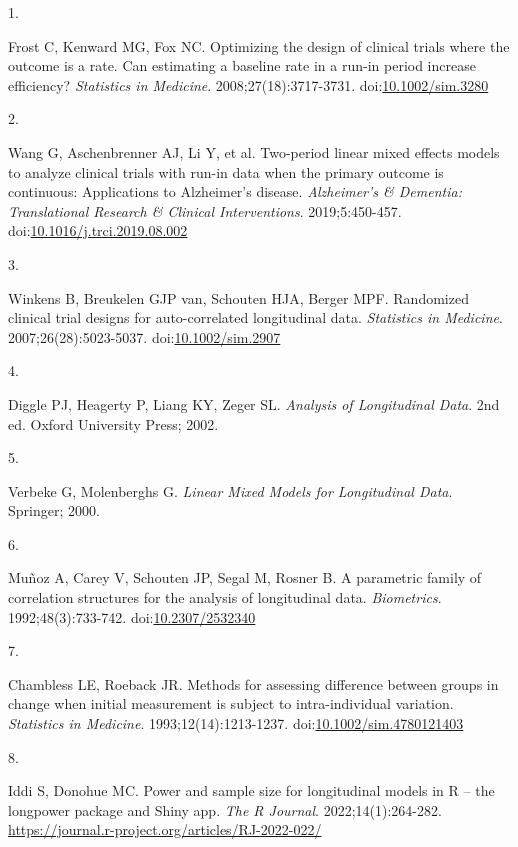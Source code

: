 \documentclass[
  11pt,
]{article}
\newlength{\cslhangindent}
\newlength{\csllabelwidth}
\newenvironment{CSLReferences}[2] %
 {\begin{list}{}{%
  \setlength{\itemindent}{0pt}
  \setlength{\leftmargin}{0pt}
  \setlength{\parsep}{0pt}
  \ifodd #1
   \setlength{\leftmargin}{\cslhangindent}
   \setlength{\itemindent}{-1\cslhangindent}
  \fi
  \setlength{\itemsep}{#2\baselineskip}}}
 {\end{list}}
\newcommand{\CSLLeftMargin}[1]{\parbox[t]{\csllabelwidth}{\strut#1\strut}}
\newcommand{\CSLRightInline}[1]{\parbox[t]{\linewidth - \csllabelwidth}{\strut#1\strut}}
\begin{document}
\protect{}\label{refs}
\begin{CSLReferences}{0}{1}
\CSLLeftMargin{1. }%
\CSLRightInline{Frost C, Kenward MG, Fox NC. Optimizing the design of clinical trials where the outcome is a rate. {Can} estimating a baseline rate in a run-in period increase efficiency? \emph{Statistics in Medicine}. 2008;27(18):3717-3731. doi:\href{https://doi.org/10.1002/sim.3280}{10.1002/sim.3280}}

\CSLLeftMargin{2. }%
\CSLRightInline{Wang G, Aschenbrenner AJ, Li Y, et al. Two-period linear mixed effects models to analyze clinical trials with run-in data when the primary outcome is continuous: {Applications} to {Alzheimer's} disease. \emph{Alzheimer's \& Dementia: Translational Research \& Clinical Interventions}. 2019;5:450-457. doi:\href{https://doi.org/10.1016/j.trci.2019.08.002}{10.1016/j.trci.2019.08.002}}

\CSLLeftMargin{3. }%
\CSLRightInline{Winkens B, Breukelen GJP van, Schouten HJA, Berger MPF. Randomized clinical trial designs for auto-correlated longitudinal data. \emph{Statistics in Medicine}. 2007;26(28):5023-5037. doi:\href{https://doi.org/10.1002/sim.2907}{10.1002/sim.2907}}

\CSLLeftMargin{4. }%
\CSLRightInline{Diggle PJ, Heagerty P, Liang KY, Zeger SL. \emph{Analysis of Longitudinal Data}. 2nd ed. Oxford University Press; 2002.}

\CSLLeftMargin{5. }%
\CSLRightInline{Verbeke G, Molenberghs G. \emph{Linear Mixed Models for Longitudinal Data}. Springer; 2000.}

\CSLLeftMargin{6. }%
\CSLRightInline{Muñoz A, Carey V, Schouten JP, Segal M, Rosner B. A parametric family of correlation structures for the analysis of longitudinal data. \emph{Biometrics}. 1992;48(3):733-742. doi:\href{https://doi.org/10.2307/2532340}{10.2307/2532340}}

\CSLLeftMargin{7. }%
\CSLRightInline{Chambless LE, Roeback JR. Methods for assessing difference between groups in change when initial measurement is subject to intra-individual variation. \emph{Statistics in Medicine}. 1993;12(14):1213-1237. doi:\href{https://doi.org/10.1002/sim.4780121403}{10.1002/sim.4780121403}}

\CSLLeftMargin{8. }%
\CSLRightInline{Iddi S, Donohue MC. Power and sample size for longitudinal models in {R} -- the longpower package and {Shiny} app. \emph{The R Journal}. 2022;14(1):264-282. \url{https://journal.r-project.org/articles/RJ-2022-022/}}


\end{CSLReferences}
\end{document}
